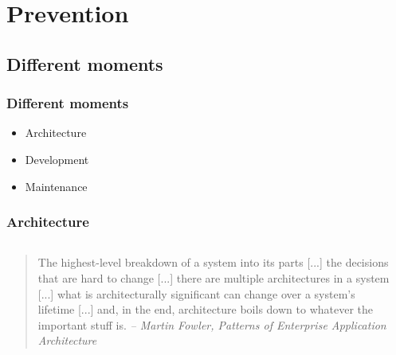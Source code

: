 \section{Prevention}

\subsection{Different moments}

\begin{frame}
\frametitle{Different moments}

\begin{itemize}
\Large
\item Architecture
\item Development
\item Maintenance
\end{itemize}
\end{frame}

\begin{frame}
\frametitle{Architecture}
\begin{columns}
\begin{column}{0.7\linewidth}
\begin{quote}
\begin{small}
The {\large\color{emphasis} highest-level breakdown} of a system into its parts [...] the decisions that are
{\large\color{emphasis} hard to change} [...] there are multiple architectures in a system [...] what is
architecturally significant can change over a system's lifetime [...] and, in the
end, architecture boils down to whatever the {\large\color{emphasis} important stuff} is.
\newline \textit{-- Martin Fowler, Patterns of Enterprise Application Architecture}
\end{small}
\end{quote}
\end{column}
\begin{column}{0.3\linewidth}
\end{column}
\end{columns}
\end{frame}

